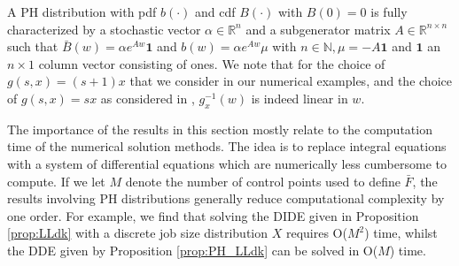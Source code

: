 \documentclass[12pt]{report}
\newtheorem{remark}{Remark}
\begin{document}
A PH distribution with pdf $b(\cdot)$ and cdf $B(\cdot)$ with $B(0)=0$ is fully characterized by a stochastic vector $\alpha \in \mathbb{R}^n$ and a subgenerator matrix $A \in \mathbb{R}^{n\times n}$ such that $\bar B(w) = \alpha e^{Aw} \textbf{1}$ and $b(w) = \alpha e^{Aw} \mu$ with $n\in \mathbb{N}, \mu = -A \textbf{1}$ and $\textbf{1}$ an $n\times 1$ column vector consisting of ones. 
We note that for the choice of $g(s,x)=(s+1)x$ that we consider in our numerical examples, and the choice of $g(s,x)=sx$ as considered in \cite{gardner1}, $g_x^{-1}(w)$ is indeed linear in $w$. 

The importance of the results in this section mostly relate to the computation time 
of the numerical solution methods.  The idea is to replace integral equations with a system of differential equations which are numerically less cumbersome to compute.
If we let $M$ denote the number of control points used to define $\bar F$, the results involving PH distributions generally reduce computational complexity by one order. For example, we find that 
solving the DIDE given in Proposition \ref{prop:LLdk} with a discrete job size distribution $X$ requires O($M^2$) time, whilst the DDE given by Proposition \ref{prop:PH_LLdk} can be solved in O($M$) time.
\end{document}
